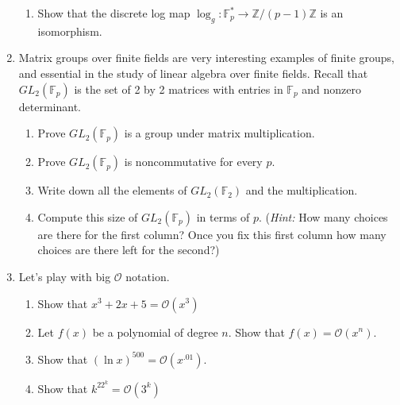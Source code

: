 \documentclass[11pt]{article}
\newcommand{\bF}{\mathbb{F}}
\newcommand{\bZ}{\mathbb{Z}}
\newcommand{\cO}{\mathcal{O}}
\begin{document}
\begin{enumerate}
{\begin{enumerate}
{    }
    \item{
    Show that the discrete log map $\log_g:\bF_p^*\to\bZ/(p-1)\bZ$ is an isomorphism.
    }
  \end{enumerate}
  }
  \item{
  Matrix groups over finite fields are very interesting examples of finite groups, and essential in the study of linear algebra over finite fields.  Recall that $GL_2(\bF_p)$ is the set of 2 by 2 matrices with entries in $\bF_p$ and nonzero determinant.
  \begin{enumerate}
    \item{
    Prove $GL_2(\bF_p)$ is a group under matrix multiplication.
    }
    \item{
    Prove $GL_2(\bF_p)$ is noncommutative for every $p$.
    }
    \item{
    Write down all the elements of $GL_2(\bF_2)$ and the multiplication.
    }
    \item{
    Compute this size of $GL_2(\bF_p)$ in terms of $p$.  (\textit{Hint:} How many choices are there for the first column?  Once you fix this first column how many choices are there left for the second?)
    }
  \end{enumerate}
  }
  \item{
  Let's play with big $\cO$ notation.
  \begin{enumerate}
    \item{
    Show that $x^3 + 2x + 5 = \cO(x^3)$
    }
    \item{
    Let $f(x)$ be a polynomial of degree $n$.  Show that $f(x) = \cO(x^n)$.
    }
    \item{
    Show that $(\ln x)^{500} = \cO(x^{.01})$.
    }
    \item{
    Show that $k^22^k = \cO(3^k)$
    }
  \end{enumerate}
  }
\end{enumerate}
\end{document}

